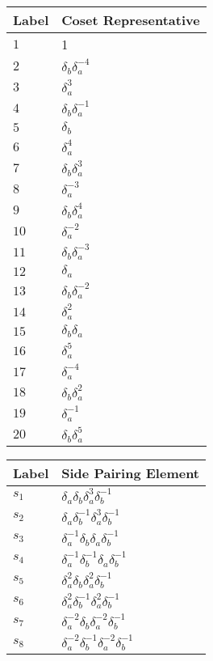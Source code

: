 \documentclass{article}
\begin{document}
\begin{center}
\begin{tabular}{ll}
\toprule
Label & Coset Representative\\
\midrule
$1$ & 1 \\
$2$ & $\delta_b^{}\delta_a^{-4}$ \\
$3$ & $\delta_a^{3}$ \\
$4$ & $\delta_b^{}\delta_a^{-1}$ \\
$5$ & $\delta_b^{}$ \\
$6$ & $\delta_a^{4}$ \\
$7$ & $\delta_b^{}\delta_a^{3}$ \\
$8$ & $\delta_a^{-3}$ \\
$9$ & $\delta_b^{}\delta_a^{4}$ \\
$10$ & $\delta_a^{-2}$ \\
$11$ & $\delta_b^{}\delta_a^{-3}$ \\
$12$ & $\delta_a^{}$ \\
$13$ & $\delta_b^{}\delta_a^{-2}$ \\
$14$ & $\delta_a^{2}$ \\
$15$ & $\delta_b^{}\delta_a^{}$ \\
$16$ & $\delta_a^{5}$ \\
$17$ & $\delta_a^{-4}$ \\
$18$ & $\delta_b^{}\delta_a^{2}$ \\
$19$ & $\delta_a^{-1}$ \\
$20$ & $\delta_b^{}\delta_a^{5}$ \\
\bottomrule
\end{tabular}
\hfill
\begin{tabular}{ll}
\toprule
Label & Side Pairing Element\\
\midrule
$s_{1}$ & $\delta_a^{}\delta_b^{}\delta_a^{3}\delta_b^{-1}$ \\
$s_{2}$ & $\delta_a^{}\delta_b^{-1}\delta_a^{3}\delta_b^{-1}$ \\
$s_{3}$ & $\delta_a^{-1}\delta_b^{}\delta_a^{}\delta_b^{-1}$ \\
$s_{4}$ & $\delta_a^{-1}\delta_b^{-1}\delta_a^{}\delta_b^{-1}$ \\
$s_{5}$ & $\delta_a^{2}\delta_b^{}\delta_a^{2}\delta_b^{-1}$ \\
$s_{6}$ & $\delta_a^{2}\delta_b^{-1}\delta_a^{2}\delta_b^{-1}$ \\
$s_{7}$ & $\delta_a^{-2}\delta_b^{}\delta_a^{-2}\delta_b^{-1}$ \\
$s_{8}$ & $\delta_a^{-2}\delta_b^{-1}\delta_a^{-2}\delta_b^{-1}$ \\

\end{tabular}
\end{center}
\end{document}
